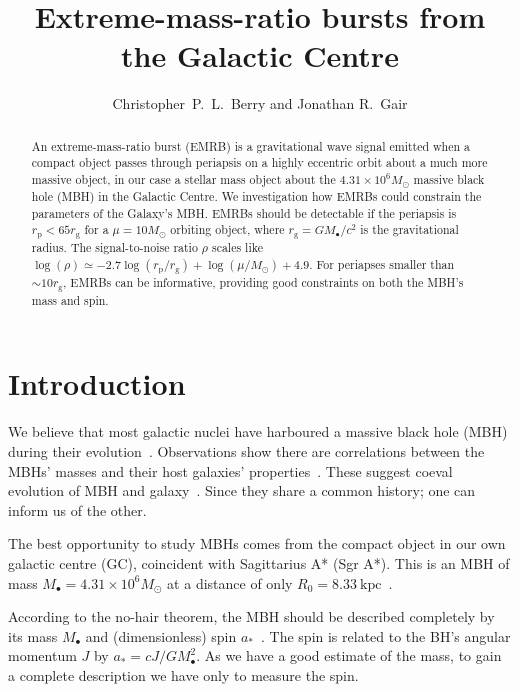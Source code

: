 \documentclass[11pt,twoside]{article}
\begin{document}
\resetcounters

\title{Extreme-mass-ratio bursts from the Galactic Centre}
 \author{Christopher~P.~L.~Berry and Jonathan R.\ Gair }
 
\begin{abstract} 
An extreme-mass-ratio burst (EMRB) is a gravitational wave signal emitted when a compact object passes through periapsis on a highly eccentric orbit about a much more massive object, in our case a stellar mass object about the $4.31 \times 10^6 M_\odot$ massive black hole (MBH) in the Galactic Centre. We investigation how EMRBs could constrain the parameters of the Galaxy's MBH. EMRBs should be detectable if the periapsis is $r_\mathrm{p} < 65 r_\mathrm{g}$ for a $\mu = 10 M_\odot$ orbiting object, where $r_\mathrm{g} = GM_\bullet/c^2$ is the gravitational radius. The signal-to-noise ratio $\rho$ scales like $\log(\rho) \simeq -2.7\log(r_\mathrm{p}/r_\mathrm{g}) + \log(\mu/M_\odot) + 4.9$. For periapses smaller than $\sim 10 r_\mathrm{g}$, EMRBs can be informative, providing good constraints on both the MBH's mass and spin.
\end{abstract}

\section{Introduction} 

We believe that most galactic nuclei have harboured a massive black hole (MBH) during their evolution~\citep{Lynden-Bell1971, Rees1984}. Observations show there are correlations between the MBHs' masses and their host galaxies' properties~\citep{Kormendy1995, Magorrian1998, Graham2011}. These suggest coeval evolution of MBH and galaxy~\citep{Peng2007, Jahnke2011}. Since they share a common history; one can inform us of the other.

The best opportunity to study MBHs comes from the compact object in our own galactic centre (GC), coincident with Sagittarius A* (Sgr A*). This is an MBH of mass $M_\bullet = 4.31 \times 10^6 M_\odot$ at a distance of only $R_0 = 8.33~\mathrm{kpc}$~\citep{Gillessen2009}.

According to the no-hair theorem, the MBH should be described completely by its mass $M_\bullet$ and (dimensionless) spin $a_\ast$~\citep{Chandrasekhar1998}. The spin is related to the BH's angular momentum $J$ by $a_\ast = cJ/GM_\bullet^2$. As we have a good estimate of the mass, to gain a complete description we have only to measure the spin.
\end{document}
